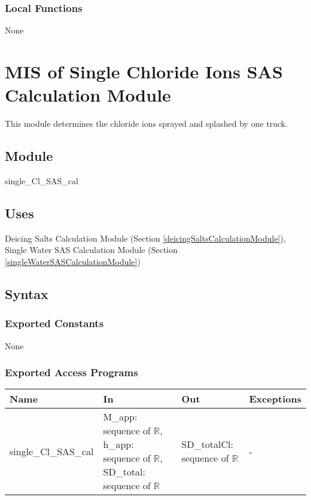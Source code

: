\documentclass[12pt, titlepage]{article}
\begin{document}
\subsubsection{Local Functions}
None
\newpage


\section{MIS of Single Chloride Ions SAS Calculation Module} \label{singleChlorideIonsSASCalculationModule}
This module determines the chloride ions sprayed and splashed by one truck.

\subsection{Module}
single\_Cl\_SAS\_cal

\subsection{Uses}

Deicing Salts Calculation Module (Section \ref{deicingSaltsCalculationModule}), Single Water SAS Calculation Module (Section \ref{singleWaterSASCalculationModule})


\subsection{Syntax}

\subsubsection{Exported Constants}
None
\subsubsection{Exported Access Programs}

\begin{center}
\begin{tabular}{p{3cm} p{4.5cm} p{5cm} p{2cm}}
\hline
\textbf{Name} & \textbf{In} & \textbf{Out} & \textbf{Exceptions} \\
\hline
single\_Cl\_SAS\_cal & M\_app: sequence of $\mathbb{R}$, h\_app: sequence of $\mathbb{R}$, SD\_total: sequence of $\mathbb{R}$ & SD\_totalCl: sequence of $\mathbb{R}$ & - \\

\hline
\end{tabular}
\end{center}
\end{document}
